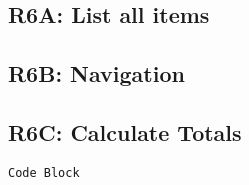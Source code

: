 \documentclass[
]{article}
\begin{document}
\hypertarget{r6a-list-all-items}{%
\subsection{R6A: List all items}\label{r6a-list-all-items}}

\hypertarget{r6b-navigation}{%
\subsection{R6B: Navigation}\label{r6b-navigation}}

\hypertarget{r6c-calculate-totals}{%
\subsection{R6C: Calculate Totals}\label{r6c-calculate-totals}}

\begin{verbatim}
Code Block
\end{verbatim}
\end{document}
